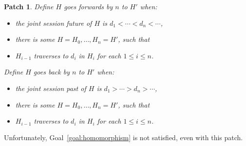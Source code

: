 \documentclass{article}
\newcommand{\aNH}{H}
\newcommand{\ltChron}{<}
\newcommand{\gtChron}{>}
\newcommand{\aDoc}{d}
\newtheorem{patch}{Patch}
\begin{document}
\begin{patch}
Define \emph{$\aNH$ goes forwards by $n$ to $\aNH'$} when:
\begin{itemize}
\item the joint session future of $\aNH$ is $\aDoc_1 \ltChron \cdots \ltChron \aDoc_n \ltChron \cdots$,
\item there is some $\aNH=\aNH_0,\ldots,\aNH_n=\aNH'$, such that
\item $H_{i-1}$ traverses to $d_i$ in $H_i$ for each $1 \le i \le n$.
\end{itemize}
Define \emph{$\aNH$ goes back by $n$ to $\aNH'$} when:
\begin{itemize}
\item the joint session past of $\aNH$ is $\aDoc_1 \gtChron \cdots \gtChron \aDoc_n \gtChron \cdots$,
\item there is some $\aNH=\aNH_0,\ldots,\aNH_n=\aNH'$, such that
\item $H_{i-1}$ traverses to $d_i$ in $H_i$ for each $1 \le i \le n$.
\end{itemize}
\end{patch}
Unfortunately, Goal~\ref{goal:homomorphism} is not satisfied,
even with this patch.
\end{document}
